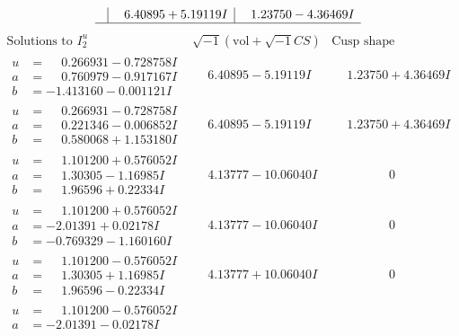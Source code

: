 \documentclass[1p]{elsarticle_modified}
\theoremstyle{definition}
\newcommand{\I}{\sqrt{-1}}
\begin{document}
$$\begin{array}{c|c|c}
 & \phantom{-}6.40895 + 5.19119 I & \phantom{-}1.23750 - 4.36469 I\\
 \hline 
 \end{array}$$\newpage$$\begin{array}{c|c|c}  
\text{Solutions to }I^u_{2}& \I (\text{vol} + \sqrt{-1}CS) & \text{Cusp shape}\\
 \hline 
\begin{aligned}
u &= \phantom{-}0.266931 - 0.728758 I \\
a &= \phantom{-}0.760979 - 0.917167 I \\
b &= -1.413160 - 0.001121 I\end{aligned}
 & \phantom{-}6.40895 - 5.19119 I & \phantom{-}1.23750 + 4.36469 I \\ \hline\begin{aligned}
u &= \phantom{-}0.266931 - 0.728758 I \\
a &= \phantom{-}0.221346 - 0.006852 I \\
b &= \phantom{-}0.580068 + 1.153180 I\end{aligned}
 & \phantom{-}6.40895 - 5.19119 I & \phantom{-}1.23750 + 4.36469 I \\ \hline\begin{aligned}
u &= \phantom{-}1.101200 + 0.576052 I \\
a &= \phantom{-}1.30305 - 1.16985 I \\
b &= \phantom{-}1.96596 + 0.22334 I\end{aligned}
 & \phantom{-}4.13777 - 10.06040 I & \phantom{-0.000000 } 0 \\ \hline\begin{aligned}
u &= \phantom{-}1.101200 + 0.576052 I \\
a &= -2.01391 + 0.02178 I \\
b &= -0.769329 - 1.160160 I\end{aligned}
 & \phantom{-}4.13777 - 10.06040 I & \phantom{-0.000000 } 0 \\ \hline\begin{aligned}
u &= \phantom{-}1.101200 - 0.576052 I \\
a &= \phantom{-}1.30305 + 1.16985 I \\
b &= \phantom{-}1.96596 - 0.22334 I\end{aligned}
 & \phantom{-}4.13777 + 10.06040 I & \phantom{-0.000000 } 0 \\ \hline\begin{aligned}
u &= \phantom{-}1.101200 - 0.576052 I \\
a &= -2.01391 - 0.02178 I \\

\end{aligned}
\end{array}$$
\end{document}
